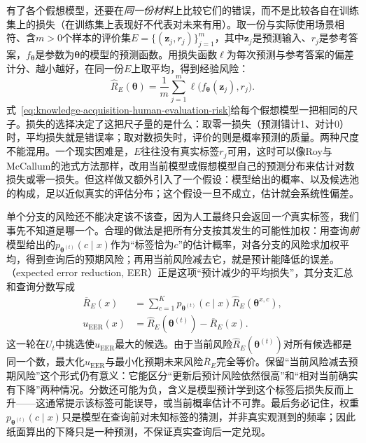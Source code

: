 有了各个假想模型，还要在\emph{同一份材料}上比较它们的错误，而不是比较各自在训练集上的损失（在训练集上表现好不代表对未来有用）。取一份与实际使用场景相符、含$m>0$个样本的评价集$E=\{(\bm{z}_j,r_j)\}_{j=1}^{m}$，其中$\bm{z}_j$是预测输入、$r_j$是参考答案，$f_{\bm{\theta}}$是参数为$\bm{\theta}$的模型的预测函数。用损失函数$\ell$为每次预测与参考答案的偏差计分、越小越好，在同一份$E$上取平均，得到经验风险：
\begin{equation}
  \widehat R_E(\bm{\theta})
  =\frac{1}{m}\sum_{j=1}^{m}
  \ell\bigl(f_{\bm{\theta}}(\bm{z}_j),r_j\bigr).
  \label{eq:knowledge-acquisition-human-evaluation-risk}
\end{equation}
式~\eqref{eq:knowledge-acquisition-human-evaluation-risk}给每个假想模型一把相同的尺子。损失的选择决定了这把尺子量的是什么：取零一损失（预测错计1、对计0）时，平均损失就是错误率；取对数损失时，评价的则是概率预测的质量。两种尺度不能混用。一个现实困难是，$E$往往没有真实标签$r_j$可用，这时可以像Roy与McCallum的池式方法那样，改用当前模型或假想模型自己的预测分布来估计对数损失或零一损失。但这样做又额外引入了一个假设：模型给出的概率、以及候选池的构成，足以近似真实的评估分布；这个假设一旦不成立，估计就会系统性偏差。

单个分支的风险还不能决定该不该查，因为人工最终只会返回\emph{一个}真实标签，我们事先不知道是哪一个。合理的做法是把所有分支按其发生的可能性加权：用查询\emph{前}模型给出的$p_{\bm{\theta}^{(t)}}(c\mid x)$作为“标签恰为$c$”的估计概率，对各分支的风险求加权平均，得到查询后的预期风险；再用当前风险减去它，就是预计能降低的误差。（expected error reduction, EER）正是这项“预计减少的平均损失”，其分支汇总和查询分数写成
\begin{align}
  \overline R_E(x)
    &=\sum_{c=1}^{K}
      p_{\bm{\theta}^{(t)}}(c\mid x)
      \widehat R_E(\bm{\theta}^{x,c}),
  \label{eq:knowledge-acquisition-human-expected-future-risk}\\
  u_{\mathrm{EER}}(x)
    &=\widehat R_E(\bm{\theta}^{(t)})
      -\overline R_E(x).
  \label{eq:knowledge-acquisition-human-expected-error-reduction}
\end{align}
这一轮在$U_t$中挑选使$u_{\mathrm{EER}}$最大的候选。由于当前风险$\widehat R_E(\bm{\theta}^{(t)})$对所有候选都是同一个数，最大化$u_{\mathrm{EER}}$与最小化预期未来风险$\overline R_E$完全等价。保留“当前风险减去预期风险”这个形式仍有意义：它能区分“更新后预计风险依然很高”和“相对当前确实有下降”两种情况。分数还可能为负，含义是模型预计学到这个标签后损失反而上升——这通常提示该标签可能误导，或当前概率估计不可靠。最后务必记住，权重$p_{\bm{\theta}^{(t)}}(c\mid x)$只是模型在查询前对未知标签的猜测，并非真实观测到的频率；因此纸面算出的下降只是一种预测，不保证真实查询后一定兑现。

